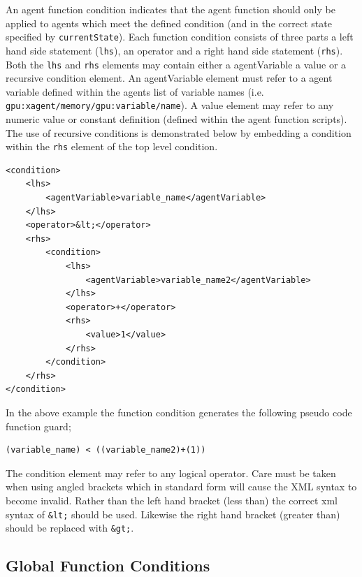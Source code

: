\documentclass[11pt, a4paper, onecolumn, oneside]{report}
\begin{document}
An agent function condition indicates that the agent function should only be applied to agents which meet the defined condition (and in the correct state specified by \texttt{currentState}).
Each function condition consists of three parts a left hand side statement (\texttt{lhs}), an operator and a right hand side statement (\texttt{rhs}).
Both the \texttt{lhs} and \texttt{rhs} elements may contain either a agentVariable a value or a recursive condition element.
An agentVariable element must refer to a agent variable defined within the agents list of variable names (i.e.
\texttt{gpu:xagent/memory/gpu:variable/name}).
A value element may refer to any numeric value or constant definition (defined within the agent function scripts).
The use of recursive conditions is demonstrated below by embedding a condition within the \texttt{rhs} element of the top level condition.


\begin{verbatim}
<condition>
    <lhs>
        <agentVariable>variable_name</agentVariable>
    </lhs>
    <operator>&lt;</operator>
    <rhs>
        <condition>
            <lhs>
                <agentVariable>variable_name2</agentVariable>
            </lhs>
            <operator>+</operator>
            <rhs>
                <value>1</value>
            </rhs>
        </condition>
    </rhs>
</condition>
\end{verbatim}

In the above example the function condition generates the following pseudo code function guard;

\begin{verbatim}
(variable_name) < ((variable_name2)+(1))
\end{verbatim}

The condition element may refer to any logical operator.
Care must be taken when using angled brackets which in standard form will cause the XML syntax to become invalid.
Rather than the left hand bracket (less than) the correct xml syntax of 
\texttt{&lt;} should be used.
Likewise the right hand bracket (greater than) should be replaced with 
\texttt{&gt;}.


\subsection{Global Function Conditions}
\label{sec:255}
\end{document}
